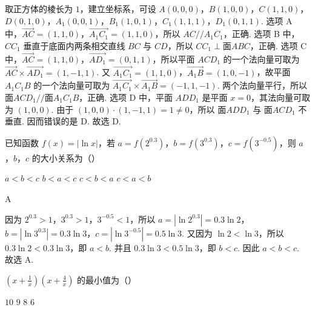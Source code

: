 \begin{solution}
取正方体的棱长为 \(1\)，建立坐标系，可设 \(A(0,0,0)\)，\(B(1,0,0)\)，\(C(1,1,0)\)，\(D(0,1,0)\)，\(A_1(0,0,1)\)，\(B_1(1,0,1)\)，\(C_1(1,1,1)\)，\(D_1(0,1,1)\).
选项 A 中，\(\overrightarrow{AC}=\left( 1,1,0 \right)\)，\(\overrightarrow{A_1C_1}=\left( 1,1,0 \right)\)，所以 \(AC//A_1C_1\)，正确.
选项 B 中，\(CC_1\) 垂直于底面内两条相交直线 \(BC\) 与 \(CD\)，所以 \(CC_1\perp \text{面} ABC\)，正确.
选项 C 中，\(\overrightarrow{AC}=\left( 1,1,0 \right)\)，\(\overrightarrow{AD_1}=\left( 0,1,1 \right)\)，所以平面 \(ACD_1\) 的一个法向量可取为 \(\overrightarrow{AC}\times \overrightarrow{AD_1}=\left( 1,-1,1 \right)\). 又 \(\overrightarrow{A_1C_1}=\left( 1,1,0 \right)\)，\(\overrightarrow{A_1B}=\left( 1,0,-1 \right)\)，故平面 \(A_1C_1B\) 的一个法向量可取为 \(\overrightarrow{A_1C_1}\times \overrightarrow{A_1B}=\left( -1,1,-1 \right)\). 两个法向量平行，所以 \(\text{面} ACD_1//\text{面} A_1C_1B\)，正确.
选项 D 中，平面 \(ADD_1\) 是平面 \(x=0\)，其法向量可取为 \(\left( 1,0,0 \right)\). 由于 \(\left( 1,0,0 \right)\cdot \left( 1,-1,1 \right)=1\ne 0\)，所以 \(\text{面} ADD_1\) 与 \(\text{面} ACD_1\) 不垂直. 因而错误的是 D.
故选 D.
\end{solution}

\begin{problem}
已知函数 \(f(x)=|\ln x|\)，若 \(a=f\left( 2^{0.3} \right)\)，\(b=f\left( 3^{0.3} \right)\)，\(c=f\left( 3^{-0.5} \right)\)，则 \(a\)，\(b\)，\(c\) 的大小关系为（\quad）

\choices
    {\(a<b<c\)}
    {\(b<a<c\)}
    {\(c<b<a\)}
    {\(c<a<b\)}
\end{problem}

\begin{answer}
A
\end{answer}

\begin{solution}
因为 \(2^{0.3}>1\)，\(3^{0.3}>1\)，\(3^{-0.5}<1\)，所以 \(a=\left| \ln 2^{0.3} \right|=0.3\ln 2\)，\(b=\left| \ln 3^{0.3} \right|=0.3\ln 3\)，\(c=\left| \ln 3^{-0.5} \right|=0.5\ln 3\).
又因为 \(\ln 2<\ln 3\)，所以 \(0.3\ln 2<0.3\ln 3\)，即 \(a<b\).
并且 \(0.3\ln 3<0.5\ln 3\)，即 \(b<c\).
因此 \(a<b<c\).
故选 A.
\end{solution}

\begin{problem}
\(\left( x+\frac{1}{x} \right)\left( x+\frac{4}{x} \right)\) 的最小值为（\quad）

\choices
    {\(10\)}
    {\(9\)}
    {\(8\)}
    {\(6\)}
\end{problem}

